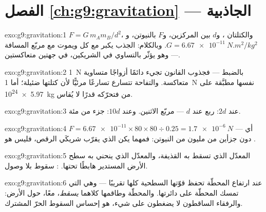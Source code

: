 \section*{الفصل \ref{ch:g9:gravitation} --- الجاذبية}

\begin{solution}{exo:g9:gravitation:1}
$F = G \, m_A m_B / d^2$، والكتلتان ، و$d$ 
بين المركزين، و$F$ بالنيوتن، و$G = \qty{6.67e-11}{N.m^2/kg^2}$.
وبالكلام: الجذب يكبر مع كل  ويموت مع مربّع المسافة ---
وهو يؤثّر بالتساوي في الشريكين، في جهتين متعاكستين.
\end{solution}

\begin{solution}{exo:g9:gravitation:2}
 \qty{1}{N} بالضبط --- فجذوب القانون تجيء دائمًا أزواجًا
متساوية متعاكسة. والتفاحة تتسارع تسارعًا مرئيًّا لأن كتلتها
ضئيلة؛ أما \qty{1}{N} نفسها مطبَّقة على \qty{5.97e24}{kg} من
 فتحرّكه قدرًا لا يُقاس.
\end{solution}

\begin{solution}{exo:g9:gravitation:3}
عند $2d$: ربع  عند $d$ --- مربّع الاثنين. وعند $10d$: جزء
من مئة.
\end{solution}

\begin{solution}{exo:g9:gravitation:4}
$F = \num{6.67e-11} \times 80 \times 80 \div 0.25 =
\qty{1.7e-6}{N}$ --- أي دون جزأين من مليون من النيوتن: فمهما
يكن الذي يقرّب شريكَي الرقص، فليس هو .
\end{solution}

\begin{solution}{exo:g9:gravitation:5}
المعدّل الذي تسقط به القذيفة، والمعدّل الذي ينحني به سطح الأرض
المستدير هابطًا تحتها. : سقوط بلا وصول.
\end{solution}

\begin{solution}{exo:g9:gravitation:6}
عند ارتفاع المحطّة تحفظ  قوّتها السطحية كلها تقريبًا
--- وهي التي تمسك المحطّة على دائرتها. والمحطّة وطاقمها كلاهما
\emph{يسقط}، معًا، حول الأرض: والرفقاء الساقطون لا يضغطون على
شيء،  هو إحساس السقوط الحرّ المشترك.
\end{solution}

